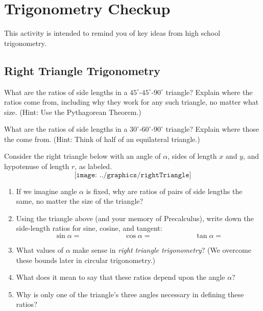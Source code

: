 \newpage 

\section{Trigonometry Checkup}
This activity is intended to remind you of key ideas from high school trigonometry. 

\subsection{Right Triangle Trigonometry}
\begin{prob}
What are the ratios of side lengths in a $45^\circ$-$45^\circ$-$90^\circ$ triangle?  Explain where the ratios come from, including why they work for any such triangle, no matter what size.  (Hint: Use the Pythagorean Theorem.)
\end{prob}

\vspace{0.1in}

\begin{prob}
What are the ratios of side lengths in a $30^\circ$-$60^\circ$-$90^\circ$ triangle?  Explain where those the come from.  (Hint: Think of half of an equilateral triangle.)
\end{prob}

\vspace{0.1in}

\begin{prob}
Consider the right triangle below with an angle of $\alpha$, sides of length $x$ and $y$, and hypotenuse of length $r$, as labeled.  
$$\texttt{[image: ../graphics/rightTriangle]}$$
\begin{enumerate}
\itemsep 12pt
\item If we imagine angle $\alpha$ is fixed, why are ratios of pairs of side lengths the same, no matter the size of the triangle?
\item Using the triangle above (and your memory of Precalculus), write down the side-length ratios for sine, cosine, and tangent:  
$$\sin\alpha = \hspace{1in} \cos\alpha = \hspace{1in} \tan\alpha =$$
\item What values of $\alpha$ make sense in \emph{right triangle trigonometry}?  (We overcome these bounds later in circular trigonometry.)  
\item What does it mean to say that these ratios depend upon the angle $\alpha$?  
\item Why is only one of the triangle's three angles necessary in defining these ratios?  
\end{enumerate}
\end{prob}


